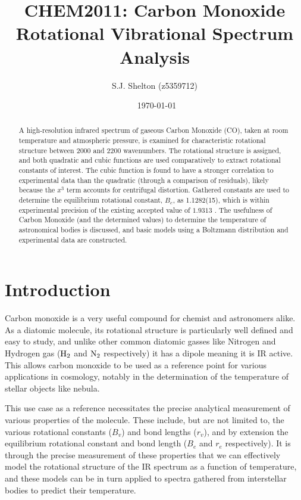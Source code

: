 \documentclass[aps,prl,reprint,10pt,amsmath,amssymb,superscriptaddress,a4paper]{revtex4-2}
\begin{document}
\title{CHEM2011: Carbon Monoxide Rotational Vibrational Spectrum Analysis}

\author{S.J. Shelton (z5359712)}
\date{\currenttime~\today}

\begin{abstract}
A high-resolution infrared spectrum of gaseous Carbon Monoxide (CO), taken at room temperature and atmospheric pressure, is examined for characteristic rotational structure between 2000 and 2200 wavenumbers. The rotational structure is assigned, and both quadratic and cubic functions are used comparatively to extract rotational constants of interest. The cubic function is found to have a stronger correlation to experimental data than the quadratic (through a comparison of residuals), likely because the $x^3$ term accounts for centrifugal distortion. Gathered constants are used to determine the equilibrium rotational constant, $B_e$, as 1.1282(15), which is within experimental precision of the existing accepted value of $1.9313$ \cite{NIST}. The usefulness of Carbon Monoxide (and the determined values) to determine the temperature of astronomical bodies is discussed, and basic models using a Boltzmann distribution and experimental data are constructed.
\end{abstract}

\maketitle

\section{Introduction}

Carbon monoxide is a very useful compound for chemist and astronomers alike. As a diatomic molecule, its rotational structure is particularly well defined and easy to study, and unlike other common diatomic gasses like Nitrogen and Hydrogen gas ($\textnormal{H}_2$ and $\textnormal{N}_2$ respectively) it has a dipole meaning it is IR active. This allows carbon monoxide to be used as a reference point for various applications in cosmology, notably in the determination of the temperature of stellar objects like nebula.

This use case as a reference necessitates the precise analytical measurement of various properties of the molecule. These include, but are not limited to, the various rotational constants ($B_v$) and bond lengths ($r_v$), and by extension the equilibrium rotational constant and bond length ($B_e$ and $r_e$ respectively). It is through the precise measurement of these properties that we can effectively model the rotational structure of the IR spectrum as a function of temperature, and these models can be in turn applied to spectra gathered from interstellar bodies to predict their temperature.
\end{document}
